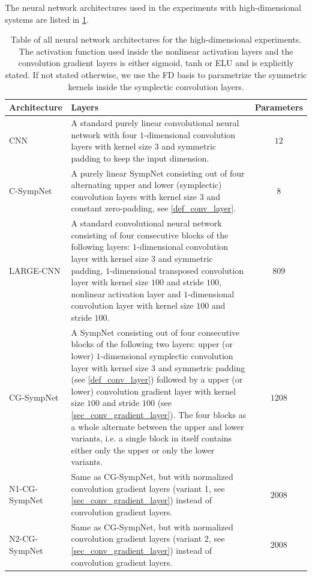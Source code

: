 \documentclass[twoside,a4paper]{article}
\begin{document}
The neural network architectures used in the experiments with high-dimensional systems
are listed in \cref{table_high_dim_arch}.
\begin{table}
	\centering
	\begin{tabular}{lp{8cm}c}
		\toprule Architecture & Layers & Parameters \\
		\midrule CNN & 
		A standard purely linear convolutional neural network with four $1$-dimensional
		convolution layers with kernel size $3$ and symmetric padding to keep the input dimension. 
		& $12$ \\
		C-SympNet & A purely linear SympNet consisting out of four alternating upper and lower
		(symplectic) convolution layers with kernel size $3$ and constant zero-padding,
		see \cref{def_conv_layer}. 
		& $8$ \\
		LARGE-CNN &
		A standard convolutional neural network consisting of four consecutive blocks of
		the following layers: $1$-dimensional convolution layer with kernel size $3$
		and symmetric padding, $1$-dimensional transposed convolution layer
		with kernel size $100$ and stride $100$, nonlinear activation layer
		and $1$-dimensional convolution layer with kernel size $100$ and stride $100$. 
		& $809$ \\
		CG-SympNet & 
		A SympNet consisting out of four consecutive blocks of
		the following two layers: upper (or lower) $1$-dimensional symplectic convolution layer with
		kernel size $3$ and symmetric padding (see \cref{def_conv_layer}) 
		followed by a upper (or lower) convolution gradient layer
		with kernel size $100$ and stride $100$ (see \cref{sec_conv_gradient_layer}). 
		The four blocks as a whole alternate between
		the upper and lower variants, i.e. a single block in itself contains either only the upper or only
		the lower variants. 
		& $1208$ \\
		N1-CG-SympNet & Same as CG-SympNet, but with normalized convolution gradient layers
		(variant 1, see \cref{sec_conv_gradient_layer}) instead of convolution gradient layers.
		& $2008$ \\
		N2-CG-SympNet & Same as CG-SympNet, but with normalized convolution gradient layers
		(variant 2, see \cref{sec_conv_gradient_layer}) instead of convolution gradient layers.
		& $2008$ \\ \bottomrule
	\end{tabular}
	\caption{Table of all neural network architectures for the
	high-dimensional experiments. The activation function used inside the nonlinear activation layers
	and the convolution gradient layers is either sigmoid, tanh or ELU and is explicitly stated.
	If not stated otherwise, we use the FD basis to parametrize the symmetric kernels 
	inside the symplectic convolution layers.}\label{table_high_dim_arch}
\end{table}
\end{document}
